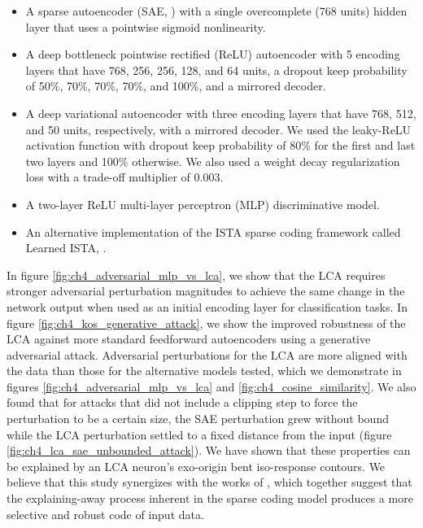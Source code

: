 \begin{itemize}
  \item A sparse autoencoder (SAE, \cite{ng2011sparse}) with a single overcomplete (768 units) hidden layer that uses a pointwise sigmoid nonlinearity.
  \item A deep bottleneck pointwise rectified (ReLU) \parencite{hahnloser2000digital, nair2010rectified} autoencoder with 5 encoding layers that have 768, 256, 256, 128, and 64 units, a dropout keep probability of 50\%, 70\%, 70\%, 70\%, and 100\%, and a mirrored decoder.
  \item A deep variational autoencoder \parencite{kingma2013auto} with three encoding layers that have 768, 512, and 50 units, respectively, with a mirrored decoder. We used the leaky-ReLU activation function \parencite{maas2013rectifier} with dropout keep probability of 80\% for the first and last two layers and 100\% otherwise. We also used a weight decay regularization loss with a trade-off multiplier of 0.003. 
  \item A two-layer ReLU multi-layer perceptron (MLP) discriminative model.
  \item An alternative implementation of the ISTA sparse coding framework called Learned ISTA, \parencite{gregor2010learning}.
\end{itemize}

In figure \ref{fig:ch4_adversarial_mlp_vs_lca}, we show that the LCA requires stronger adversarial perturbation magnitudes to achieve the same change in the network output when used as an initial encoding layer for classification tasks. In figure \ref{fig:ch4_kos_generative_attack}, we show the improved robustness of the LCA against more standard feedforward autoencoders using a generative adversarial attack. Adversarial perturbations for the LCA are more aligned with the data than those for the alternative models tested, which we demonstrate in figures \ref{fig:ch4_adversarial_mlp_vs_lca} and \ref{fig:ch4_cosine_similarity}. We also found that for attacks that did not include a clipping step to force the perturbation to be a certain size, the SAE perturbation grew without bound while the LCA perturbation settled to a fixed distance from the input (figure \ref{fig:ch4_lca_sae_unbounded_attack}). We have shown that these properties can be explained by an LCA neuron's exo-origin bent iso-response contours. We believe that this study synergizes with the works of \parencite{zhu2013visual, golden2016conjectures, vilankar2017selectivity, olshausen1997sparse}, which together suggest that the explaining-away process inherent in the sparse coding model produces a more selective and robust code of input data.


